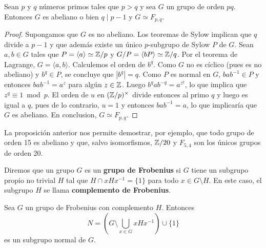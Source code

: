 \begin{proposition}
    Sean $p$ y $q$ números primos tales que $p>q$ y 
    sea $G$ un grupo de orden $pq$. Entonces $G$ es abeliano o bien 
    $q\mid p-1$ y 
    $G\simeq F_{p,q}$.
\end{proposition}

\begin{proof}
    Supongamos que $G$ es no abeliano. Los teoremas de Sylow implican que 
    $q$ divide a $p-1$ y que además 
    existe un único $p$-subgrupo de Sylow $P$ de $G$. Sean $a,b\in G$ tales que
    $P=\langle a\rangle\simeq\mathbb{Z}/p$ y $G/P=\langle bP\rangle\simeq\mathbb{Z}/q$. Por el teorema
    de Lagrange, $G=\langle a,b\rangle$. Calculemos el orden de $b^q$. Como 
    $G$ no es cíclico (pues es no abeliano) y $b^q\in P$, se concluye que $|b^q|=q$. 
    Como $P$ es normal en $G$, 
    $bab^{-1}\in P$ y entonces $bab^{-1}=a^z$ para algún $z\in\mathbb{Z}$. Luego $b^qab^{-q}=a^{z^q}$, lo que
    implica que $z^q\equiv1\bmod p$. El orden de $u$ en $(\mathbb{Z}/p)^{\times}$ divide entonces al primo $q$ y 
    luego es igual a $q$, pues de lo contrario, $u=1$ y entonces $bab^{-1}=a$, lo que implicaría que $G$ es abeliano.
    En conclusion, $G\simeq F_{p,q}$. 
\end{proof}

La proposición anterior nos permite demostrar, por ejemplo, 
que todo grupo de orden 15 es abeliano
y que, salvo isomorfismos, $\mathbb{Z}/20$ y 
$F_{5,4}$ son los 
únicos grupos de orden 20.

\begin{definition}
  Diremos que un grupo $G$ es un 
  \textbf{grupo de Frobenius} si $G$ 
  tiene un subgrupo propio no trivial $H$ tal que $H\cap
  xHx^{-1}=\{1\}$ para todo $x\in G\setminus H$. En este caso, el
  subgrupo $H$ se llama \textbf{complemento de Frobenius}.
\end{definition}

\begin{theorem}[Frobenius]
  \label{theorem:Frobenius}
  Sea $G$ un grupo de Frobenius con complemento $H$. Entonces
  \[
	N=\left( G\setminus\bigcup_{x\in G}xHx^{-1}\right)\cup\{1\}
  \]
  es un subgrupo normal de $G$.
\end{theorem}

